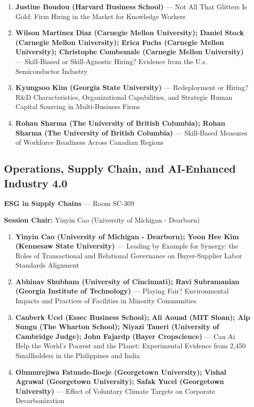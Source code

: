 \documentclass[
  10pt,
  letterpaper,
  DIV=11,
  numbers=noendperiod]{scrartcl}
\begin{document}
\begin{enumerate}
\def\labelenumi{\arabic{enumi}.}
\item
  \textbf{Justine Boudou (Harvard Business School)} --- Not All That
  Glitters Is Gold: Firm Hiring in the Market for Knowledge Workers
\item
  \textbf{Wilson Martinez Diaz (Carnegie Mellon University); Daniel
  Stock (Carnegie Mellon University); Erica Fuchs (Carnegie Mellon
  University); Christophe Combemale (Carnegie Mellon University)} ---
  Skill-Biased or Skill-Agnostic Hiring? Evidence from the U.s.
  Semiconductor Industry
\item
  \textbf{Kyungsoo Kim (Georgia State University)} --- Redeployment or
  Hiring? R\&D Characteristics, Organizational Capabilities, and
  Strategic Human Capital Sourcing in Multi-Business Firms
\item
  \textbf{Rohan Sharma (The University of British Columbia); Rohan
  Sharma (The University of British Columbia)} --- Skill-Based Measures
  of Workforce Readiness Across Canadian Regions
\end{enumerate}

\subsection{\texorpdfstring{\textcolor{operations}{Operations, Supply Chain, and AI-Enhanced Industry 4.0}}{}}\label{section-36}

\textbf{ESG in Supply Chains} --- Room SC-309

\textbf{Session Chair:} Yinyin Cao (University of Michigan - Dearborn)

\begin{enumerate}
\def\labelenumi{\arabic{enumi}.}
\item
  \textbf{Yinyin Cao (University of Michigan - Dearborn); Yoon Hee Kim
  (Kennesaw State University)} --- Leading by Example for Synergy: the
  Roles of Transactional and Relational Governance on Buyer-Supplier
  Labor Standards Alignment
\item
  \textbf{Abhinav Shubham (University of Cincinnati); Ravi Subramanian
  (Georgia Institute of Technology)} --- Playing Fair? Environmental
  Impacts and Practices of Facilities in Minority Communities
\item
  \textbf{Canberk Ucel (Essec Business School); Ali Aouad (MIT Sloan);
  Alp Sungu (The Wharton School); Niyazi Taneri (University of Cambridge
  Judge); John Fajardp (Bayer Cropscience)} --- Can Ai Help the World's
  Poorest and the Planet: Experimental Evidence from 2,450 Smallholders
  in the Philippines and India
\item
  \textbf{Olumurejiwa Fatunde-Iloeje (Georgetown University); Vishal
  Agrawal (Georgetown University); Safak Yucel (Georgetown University)}
  --- Effect of Voluntary Climate Targets on Corporate Decarbonization
\end{enumerate}
\end{document}
